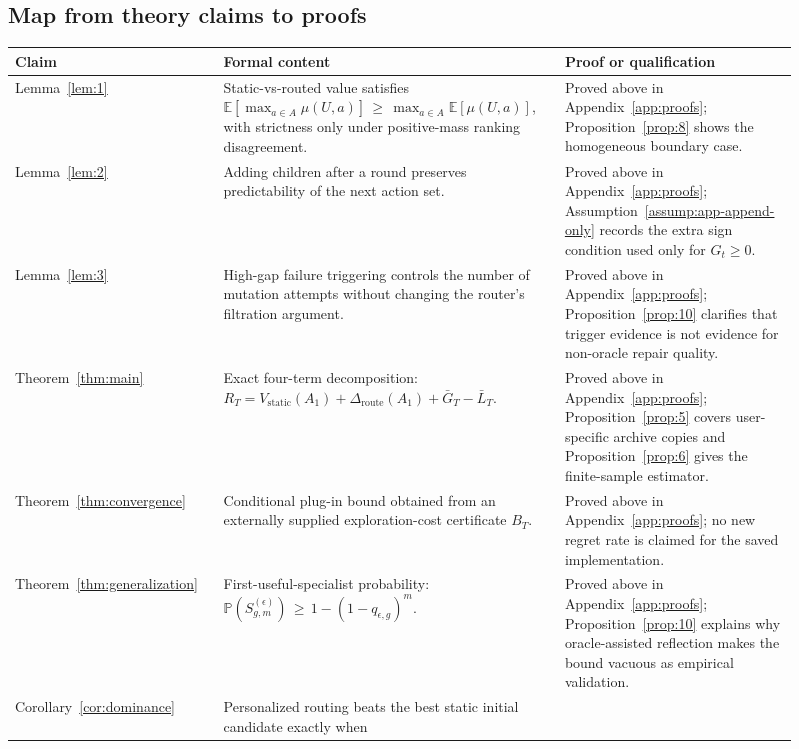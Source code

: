 \documentclass{article} %
\begin{document}
\subsection{Map from theory claims to proofs}

\begin{table}[h]
\centering
\small
\begin{tabular}{p{0.24\linewidth}p{0.39\linewidth}p{0.28\linewidth}}
\toprule
Claim & Formal content & Proof or qualification \\
\midrule
Lemma~\ref{lem:1} &
Static-vs-routed value satisfies
\(\mathbb{E}[\max_{a\in A}\mu(U,a)]\,\ge\, \max_{a\in A}\mathbb{E}[\mu(U,a)]\), with strictness only under positive-mass ranking disagreement. &
Proved above in Appendix~\ref{app:proofs}; Proposition~\ref{prop:8} shows the homogeneous boundary case. \\
\midrule
Lemma~\ref{lem:2} &
Adding children after a round preserves predictability of the next action set. &
Proved above in Appendix~\ref{app:proofs}; Assumption~\ref{assump:app-append-only} records the extra sign condition used only for \(G_t\ge 0\). \\
\midrule
Lemma~\ref{lem:3} &
High-gap failure triggering controls the number of mutation attempts without changing the router's filtration argument. &
Proved above in Appendix~\ref{app:proofs}; Proposition~\ref{prop:10} clarifies that trigger evidence is not evidence for non-oracle repair quality. \\
\midrule
Theorem~\ref{thm:main} &
Exact four-term decomposition:
\(R_T=V_{\mathrm{static}}(A_1)+\Delta_{\mathrm{route}}(A_1)+\bar G_T-\bar L_T\). &
Proved above in Appendix~\ref{app:proofs}; Proposition~\ref{prop:5} covers user-specific archive copies and Proposition~\ref{prop:6} gives the finite-sample estimator. \\
\midrule
Theorem~\ref{thm:convergence} &
Conditional plug-in bound obtained from an externally supplied exploration-cost certificate \(B_T\). &
Proved above in Appendix~\ref{app:proofs}; no new regret rate is claimed for the saved implementation. \\
\midrule
Theorem~\ref{thm:generalization} &
First-useful-specialist probability:
\(\mathbb{P}(S_{g,m}^{(\epsilon)})\,\ge\, 1-(1-q_{\epsilon,g})^m\). &
Proved above in Appendix~\ref{app:proofs}; Proposition~\ref{prop:10} explains why oracle-assisted reflection makes the bound vacuous as empirical validation. \\
\midrule
Corollary~\ref{cor:dominance} &
Personalized routing beats the best static initial candidate exactly when

\end{tabular}
\end{table}
\end{document}
